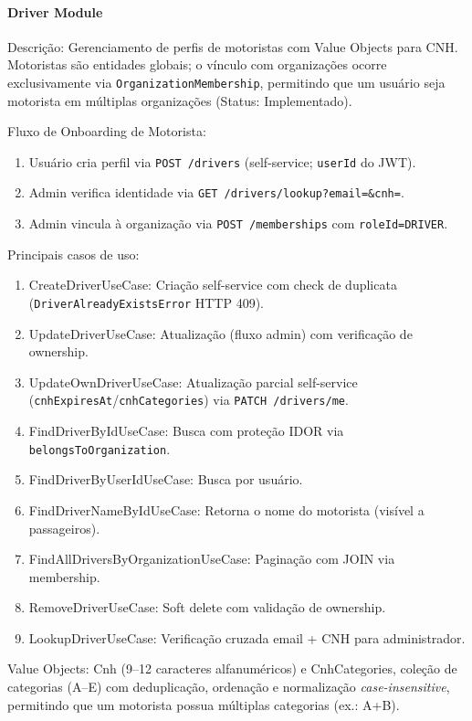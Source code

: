 \paragraph{Driver Module}

Descrição: Gerenciamento de perfis de motoristas com Value Objects para CNH. Motoristas são entidades globais; o vínculo com organizações ocorre exclusivamente via \texttt{OrganizationMembership}, permitindo que um usuário seja motorista em múltiplas organizações (Status: Implementado).

Fluxo de Onboarding de Motorista:
\begin{enumerate}
\item Usuário cria perfil via \texttt{POST /drivers} (self-service; \texttt{userId} do JWT).
\item Admin verifica identidade via \texttt{GET /drivers/lookup?email=\&cnh=}.
\item Admin vincula à organização via \texttt{POST /memberships} com \texttt{roleId=DRIVER}.
\end{enumerate}

Principais casos de uso:
\begin{enumerate}
\item CreateDriverUseCase: Criação self-service com check de duplicata (\texttt{DriverAlreadyExistsError} HTTP 409).
\item UpdateDriverUseCase: Atualização (fluxo admin) com verificação de ownership.
\item UpdateOwnDriverUseCase: Atualização parcial self-service (\texttt{cnhExpiresAt}/\texttt{cnhCategories}) via \texttt{PATCH /drivers/me}.
\item FindDriverByIdUseCase: Busca com proteção IDOR via \texttt{belongsToOrganization}.
\item FindDriverByUserIdUseCase: Busca por usuário.
\item FindDriverNameByIdUseCase: Retorna o nome do motorista (visível a passageiros).
\item FindAllDriversByOrganizationUseCase: Paginação com JOIN via membership.
\item RemoveDriverUseCase: Soft delete com validação de ownership.
\item LookupDriverUseCase: Verificação cruzada email + CNH para administrador.
\end{enumerate}

Value Objects: Cnh (9--12 caracteres alfanuméricos) e CnhCategories, coleção de categorias (A--E) com deduplicação, ordenação e normalização \textit{case-insensitive}, permitindo que um motorista possua múltiplas categorias (ex.: A+B).

